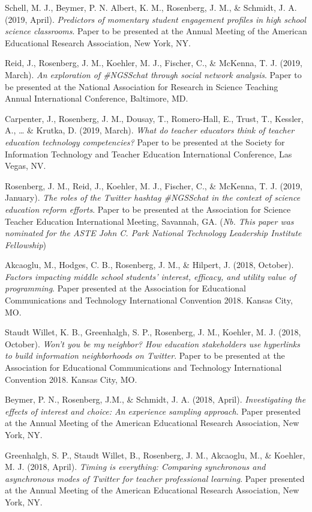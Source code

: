 \documentclass[]{article}
\begin{document}
Schell, M. J., Beymer, P. N. Albert, K. M., Rosenberg, J. M., \&
Schmidt, J. A. (2019, April). \emph{Predictors of momentary student
engagement profiles in high school science classrooms}. Paper to be
presented at the Annual Meeting of the American Educational Research
Association, New York, NY.

Reid, J., Rosenberg, J. M., Koehler, M. J., Fischer, C., \& McKenna, T.
J. (2019, March). \emph{An exploration of \#NGSSchat through social
network analysis}. Paper to be presented at the National Association for
Research in Science Teaching Annual International Conference, Baltimore,
MD.

Carpenter, J., Rosenberg, J. M., Dousay, T., Romero-Hall, E., Trust, T.,
Kessler, A., \ldots{} \& Krutka, D. (2019, March). \emph{What do teacher
educators think of teacher education technology competencies?} Paper to
be presented at the Society for Information Technology and Teacher
Education International Conference, Las Vegas, NV.

Rosenberg, J. M., Reid, J., Koehler, M. J., Fischer, C., \& McKenna, T.
J. (2019, January). \emph{The roles of the Twitter hashtag \#NGSSchat in
the context of science education reform efforts}. Paper to be presented
at the Association for Science Teacher Education International Meeting,
Savannah, GA. (\emph{Nb. This paper was nominated for the ASTE John C.
Park National Technology Leadership Institute Fellowship})

Akcaoglu, M., Hodges, C. B., Rosenberg, J. M., \& Hilpert, J. (2018,
October). \emph{Factors impacting middle school students' interest,
efficacy, and utility value of programming}. Paper presented at the
Association for Educational Communications and Technology International
Convention 2018. Kansas City, MO.

Staudt Willet, K. B., Greenhalgh, S. P., Rosenberg, J. M., Koehler, M.
J. (2018, October). \emph{Won't you be my neighbor? How education
stakeholders use hyperlinks to build information neighborhoods on
Twitter}. Paper to be presented at the Association for Educational
Communications and Technology International Convention 2018. Kansas
City, MO.

Beymer, P. N., Rosenberg, J.M., \& Schmidt, J. A. (2018, April).
\emph{Investigating the effects of interest and choice: An experience
sampling approach}. Paper presented at the Annual Meeting of the
American Educational Research Association, New York, NY.

Greenhalgh, S. P., Staudt Willet, B., Rosenberg, J. M., Akcaoglu, M., \&
Koehler, M. J. (2018, April). \emph{Timing is everything: Comparing
synchronous and asynchronous modes of Twitter for teacher professional
learning}. Paper presented at the Annual Meeting of the American
Educational Research Association, New York, NY.
\end{document}
